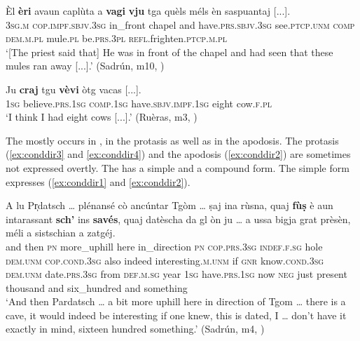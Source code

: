 \ea
\label{ex:subjimpf2}
\gll  Èl \textbf{èri} avaun caplùta a \textbf{vagi} \textbf{vju} tga quèls méls èn saspuantaj [...].  \\
\textsc{3sg.m} \textsc{cop.impf.sbjv.3sg} in\_front chapel and have.\textsc{prs.sbjv.3sg} see.\textsc{ptcp.unm} \textsc{comp} \textsc{dem.m.pl} mule.\textsc{pl} be.\textsc{prs.3pl} \textsc{refl.}frighten.\textsc{ptcp.m.pl}\\
\glt `[The priest said that] He was in front of the chapel and had seen that these mules ran away [...].' (Sadrún, m10, )
\z

\ea
\label{ex:subjimpf3}
\gll Ju \textbf{craj} tgu \textbf{vèvi} òtg vacas [...].\\
\textsc{1sg} believe.\textsc{prs.1sg} \textsc{comp.1sg} have.\textsc{sbjv.impf.1sg} eight cow.\textsc{f.pl}\\
\glt `I think I had eight cows [...].' (Ruèras, m3, )
\z

\label{sec:4.1.2.2.10}

The  mostly occurs in , in the protasis as well as in the apodosis. The protasis (\ref{ex:conddir3} and \ref{ex:conddir4}) and the apodosis (\ref{ex:conddir2}) are sometimes not expressed overtly. The  has a simple and a compound form. The simple form expresses  (\ref{ex:conddir1} and \ref{ex:conddir2}).

\ea\label{ex:conddir1}
\gll A lu Pr̩datsch … plénansé cò ancúntar Tgòm … ṣaj ina rùsna, quaj \textbf{fùṣ} è aun intarassant \textbf{sch’} ins \textbf{savés}, quaj datèscha da gl òn ju … a ussa bigja grat prèsèn, méli a sistschian a zatgéj.\\
and then \textsc{pn} {} more\_uphill here in\_direction \textsc{pn} {} \textsc{cop.prs.3sg} \textsc{indef.f.sg} hole \textsc{dem.unm} \textsc{cop.cond.3sg} also indeed interesting.\textsc{m.unm} if \textsc{gnr} know.\textsc{cond.3sg} \textsc{dem.unm} date.\textsc{prs.3sg} from \textsc{def.m.sg} year \textsc{1sg} {} have.\textsc{prs.1sg} now \textsc{neg} just present thousand and six\_hundred and something\\

\glt `And then Pardatsch … a bit more uphill here in direction of Tgom … there is a cave, it would indeed be interesting if one knew, this is dated, I … don't have it exactly in mind, sixteen hundred something.' (Sadrún, m4, )
\z

